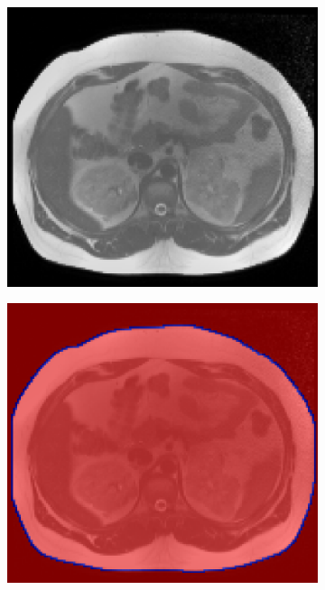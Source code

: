 \documentclass[10pt,twoside]{book}
\begin{document}
\begin{figure}
  \centering
  \begin{subfigure}{0.3\textwidth}
    \centering
    \includegraphics[width=\textwidth]{scenario4_trainingImage}
    \caption{}
    \label{fig:CNN_input_a}
  \end{subfigure}
  \begin{subfigure}{0.3\textwidth}
    \centering
    \includegraphics[width=\textwidth]{scenario4_trainingImage_segmentationOverlay}

\end{subfigure}
\end{figure}
\end{document}

